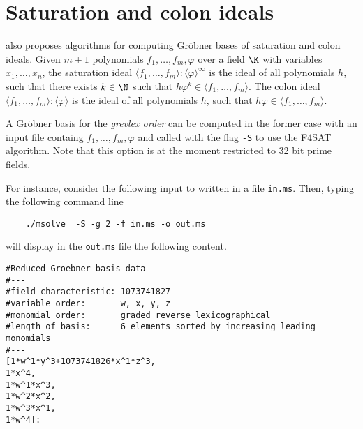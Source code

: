 \documentclass[a4paper,english,11pt]{scrartcl}
\theoremstyle{definition}
\theoremstyle{remark}
\begin{document}
\section{Saturation and colon ideals}\label{sec:f4sat}
\msolve also proposes algorithms for computing Gr\"obner bases of
saturation and colon ideals. Given $m+1$ polynomials
$f_1,\ldots,f_m,\varphi$ over a field $\K$ with variables
$x_1,\ldots,x_n$,
the saturation ideal
$\langle f_1,\ldots,f_m\rangle:\langle \varphi\rangle^{\infty}$ is the ideal of all
polynomials $h$, such that there exists $k\in\N$ such that
$h \varphi^k\in\langle f_1,\ldots,f_m\rangle$.
The colon ideal
$\langle f_1,\ldots,f_m\rangle:\langle \varphi\rangle$ is the ideal of all
polynomials $h$, such that
$h \varphi\in\langle f_1,\ldots,f_m\rangle$.

A Gr\"obner basis for the \emph{grevlex order} can be computed in the
former case with an input file containg $f_1,\ldots,f_m,\varphi$ and
called with the flag \verb+-S+ to use the F4SAT algorithm. Note that this option 
is at the moment restricted to 32 bit prime fields.

For instance, consider the following input to \msolve written in a file
\verb+in.ms+.
Then, typing the following command line
\begin{tcolorbox} %
  \begin{verbatim}
    ./msolve  -S -g 2 -f in.ms -o out.ms 
  \end{verbatim}
\end{tcolorbox}
will display in the \verb+out.ms+ file the following content. 
\begin{tcolorbox}
  \begin{lstlisting}
#Reduced Groebner basis data
#---
#field characteristic: 1073741827
#variable order:       w, x, y, z
#monomial order:       graded reverse lexicographical
#length of basis:      6 elements sorted by increasing leading monomials
#---
[1*w^1*y^3+1073741826*x^1*z^3,
1*x^4,
1*w^1*x^3,
1*w^2*x^2,
1*w^3*x^1,
1*w^4]:
  \end{lstlisting}
\end{tcolorbox}



\end{document}
